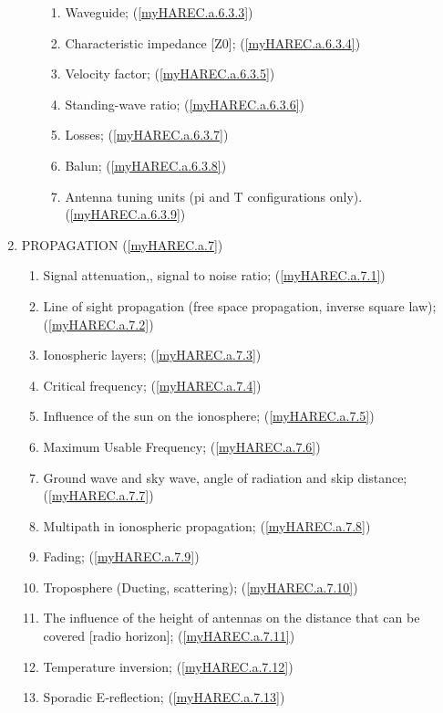 \begin{enumerate}
\begin{enumerate}[noitemsep]
\begin{enumerate}[noitemsep]
\item Waveguide; (\ref{myHAREC.a.6.3.3})\label{HAREC.a.6.3.3}
\item Characteristic impedance [Z0]; (\ref{myHAREC.a.6.3.4})\label{HAREC.a.6.3.4}
\item Velocity factor; (\ref{myHAREC.a.6.3.5})\label{HAREC.a.6.3.5}
\item Standing-wave ratio; (\ref{myHAREC.a.6.3.6})\label{HAREC.a.6.3.6}
\item Losses; (\ref{myHAREC.a.6.3.7})\label{HAREC.a.6.3.7}
\item Balun; (\ref{myHAREC.a.6.3.8})\label{HAREC.a.6.3.8}
\item Antenna tuning units (pi and T configurations only). (\ref{myHAREC.a.6.3.9})\label{HAREC.a.6.3.9}
\end{enumerate}
\end{enumerate}
\item PROPAGATION (\ref{myHAREC.a.7})\label{HAREC.a.7}
\begin{enumerate}[noitemsep]
\item Signal attenuation,, signal to noise ratio; (\ref{myHAREC.a.7.1})\label{HAREC.a.7.1}
\item Line of sight propagation (free space propagation, inverse square law); (\ref{myHAREC.a.7.2})\label{HAREC.a.7.2}
\item Ionospheric layers; (\ref{myHAREC.a.7.3})\label{HAREC.a.7.3}
\item Critical frequency; (\ref{myHAREC.a.7.4})\label{HAREC.a.7.4}
\item Influence of the sun on the ionosphere; (\ref{myHAREC.a.7.5})\label{HAREC.a.7.5}
\item Maximum Usable Frequency; (\ref{myHAREC.a.7.6})\label{HAREC.a.7.6}
\item Ground wave and sky wave, angle of radiation and skip distance; (\ref{myHAREC.a.7.7})\label{HAREC.a.7.7}
\item Multipath in ionospheric propagation; (\ref{myHAREC.a.7.8})\label{HAREC.a.7.8}
\item Fading; (\ref{myHAREC.a.7.9})\label{HAREC.a.7.9}
\item Troposphere (Ducting, scattering); (\ref{myHAREC.a.7.10})\label{HAREC.a.7.10}
\item The influence of the height of antennas on the distance that can be covered [radio horizon]; (\ref{myHAREC.a.7.11})\label{HAREC.a.7.11}
\item Temperature inversion; (\ref{myHAREC.a.7.12})\label{HAREC.a.7.12}
\item Sporadic E‑reflection; (\ref{myHAREC.a.7.13})\label{HAREC.a.7.13}

\end{enumerate}
\end{enumerate}
